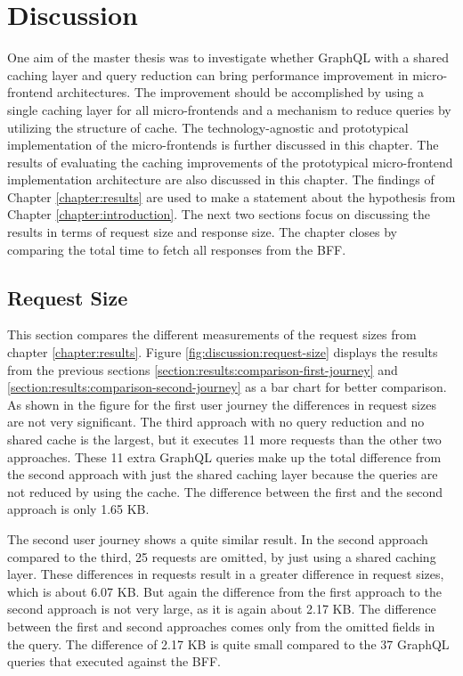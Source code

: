 \chapter{Discussion}\label{chapter:discussion}

One aim of the master thesis was to investigate whether GraphQL with a shared caching layer and query reduction can bring performance improvement in micro-frontend architectures. The improvement should be accomplished by using a single caching layer for all micro-frontends and a mechanism to reduce queries by utilizing the structure of cache. The technology-agnostic and prototypical implementation of the micro-frontends is further discussed in this chapter. The results of evaluating the caching improvements of the prototypical micro-frontend implementation architecture are also discussed in this chapter. The findings of Chapter \ref{chapter:results} are used to make a statement about the hypothesis from Chapter \ref{chapter:introduction}. The next two sections focus on discussing the results in terms of request size and response size. The chapter closes by comparing the total time to fetch all responses from the \ac{BFF}.

\section{Request Size}\label{section:discussion:request-size}

This section compares the different measurements of the request sizes from chapter \ref{chapter:results}. Figure \ref{fig:discussion:request-size} displays the results from the previous sections \ref{section:results:comparison-first-journey} and \ref{section:results:comparison-second-journey} as a bar chart for better comparison. As shown in the figure for the first user journey the differences in request sizes are not very significant. The third approach with no query reduction and no shared cache is the largest, but it executes 11 more requests than the other two approaches. These 11 extra GraphQL queries make up the total difference from the second approach with just the shared caching layer because the queries are not reduced by using the cache. The difference between the first and the second approach is only 1.65 KB. 

\bigskip

\noindent The second user journey shows a quite similar result. In the second approach compared to the third, 25 requests are omitted, by just using a shared caching layer. These differences in requests result in a greater difference in request sizes, which is about 6.07 KB. But again the difference from the first approach to the second approach is not very large, as it is again about 2.17 KB. The difference between the first and second approaches comes only from the omitted fields in the query. The difference of 2.17 KB is quite small compared to the 37 GraphQL queries that executed against the \ac{BFF}.

